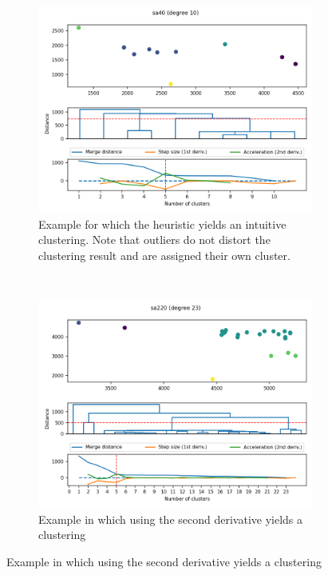 \documentclass[
	fontsize=10pt, %
	twoside=true, %
	secnumdepth=1, %
  toc=indentunnumbered %
]{kaobook}
\begin{document}
\begin{figure}[h]
  \centering
  \begin{subfigure}{0.48\linewidth}
    \includegraphics[width=1.0\textwidth]{dendrograms/sa40.png}
    \caption{
      Example for which the heuristic yields an intuitive clustering. Note that
      outliers do not distort the clustering result and are assigned their own cluster.
    }
  \end{subfigure}
  ~~~
  \begin{subfigure}{0.48\linewidth}
    \includegraphics[width=\textwidth]{dendrograms/sa220.png}
    \caption{Example in which using the second derivative yields a clustering
}
\end{subfigure}
\end{figure}
\end{document}
